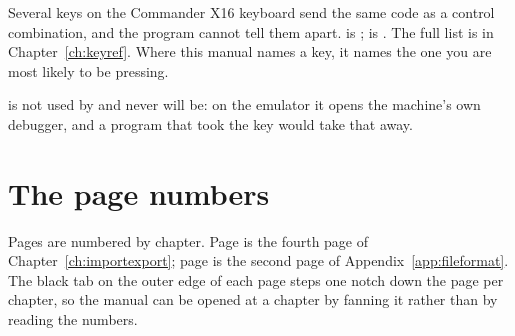 Several keys on the Commander X16 keyboard send the same code as a control
combination, and the program cannot tell them apart.  is
;  is . The full list is in Chapter~\ref{ch:keyref}.
Where this manual names a key, it names the one you are most likely to be
pressing.

 is not used by \ccprod{} and never will be: on the emulator it opens
the machine's own debugger, and a program that took the key would take that
away.

\section*{The page numbers}

Pages are numbered by chapter. Page  is the fourth page of Chapter~\ref{ch:importexport};
page  is the second page of Appendix~\ref{app:fileformat}. The black tab on the outer
edge of each page steps one notch down the page per chapter, so the manual can
be opened at a chapter by fanning it rather than by reading the numbers.

\clearpage
